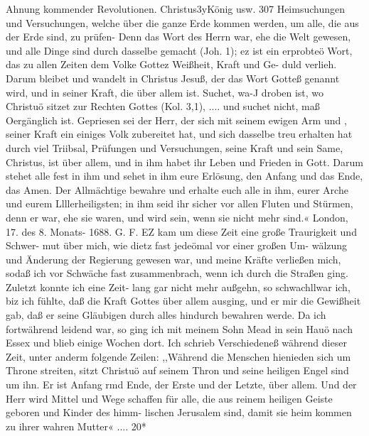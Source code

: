 Ahnung kommender Revolutionen. Christus3yKönig usw. 307
Heimsuchungen und Versuchungen, welche über die ganze Erde
kommen werden, um alle, die aus der Erde sind, zu prüfen- Denn
das Wort des Herrn war, ehe die Welt gewesen, und alle Dinge
sind durch dasselbe gemacht (Joh. 1); ez ist ein erprobteö Wort,
das zu allen Zeiten dem Volke Gottez Weißheit, Kraft und Ge-
duld verlieh. Darum bleibet und wandelt in Christus Jesuß,
der das Wort Gotteß genannt wird, und in seiner Kraft, die über
allem ist. Suchet, wa-J droben ist, wo Christuö sitzet zur Rechten
Gottes (Kol. 3,1), .... und suchet nicht, maß Oergänglich ist.
Gepriesen sei der Herr, der sich mit seinem ewigen Arm und ,
seiner Kraft ein einiges Volk zubereitet hat, und sich dasselbe treu
erhalten hat durch viel Triibsal, Prüfungen und Versuchungen,
seine Kraft und sein Same, Christus, ist über allem, und in ihm
habet ihr Leben und Frieden in Gott. Darum stehet alle fest in
ihm und sehet in ihm eure Erlösung, den Anfang und das Ende,
das Amen. Der Allmächtige bewahre und erhalte euch alle in
ihm, eurer Arche und eurem Llllerheiligsten; in ihm seid ihr sicher
vor allen Fluten und Stürmen, denn er war, ehe sie waren,
und wird sein, wenn sie nicht mehr sind.«
London, 17. des 8. Monats- 1688. G. F.
EZ kam um diese Zeit eine große Traurigkeit und Schwer-
mut über mich, wie dietz fast jedeömal vor einer großen Um-
wälzung und Änderung der Regierung gewesen war, und meine
Kräfte verließen mich, sodaß ich vor Schwäche fast zusammenbrach,
wenn ich durch die Straßen ging. Zuletzt konnte ich eine Zeit-
lang gar nicht mehr außgehn, so schwachllwar ich, biz ich fühlte,
daß die Kraft Gottes über allem ausging, und er mir die Gewißheit
gab, daß er seine Gläubigen durch alles hindurch bewahren werde.  
Da ich fortwährend leidend war, so ging ich mit meinem
Sohn Mead in sein Hauö nach Essex und blieb einige Wochen
dort. Ich schrieb Verschiedeneß während dieser Zeit, unter anderm
folgende Zeilen:
,,Während die Menschen hienieden sich um Throne streiten,
sitzt Christuö auf seinem Thron und seine heiligen Engel sind um
ihn. Er ist Anfang rmd Ende, der Erste und der Letzte, über
allem. Und der Herr wird Mittel und Wege schaffen für alle,
die aus reinem heiligen Geiste geboren und Kinder des himm-
lischen Jerusalem sind, damit sie heim kommen zu ihrer wahren
Mutter« ....
20*


